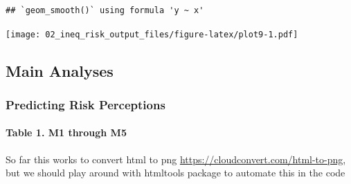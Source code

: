 \documentclass[
]{article}
\begin{document}
\begin{verbatim}
## `geom_smooth()` using formula 'y ~ x'
\end{verbatim}

\texttt{[image: 02\_ineq\_risk\_output\_files/figure-latex/plot9-1.pdf]}

\hypertarget{main-analyses}{%
\subsection{Main Analyses}\label{main-analyses}}

\hypertarget{predicting-risk-perceptions}{%
\subsubsection{Predicting Risk
Perceptions}\label{predicting-risk-perceptions}}

\hypertarget{table-1.-m1-through-m5}{%
\paragraph{Table 1. M1 through M5}\label{table-1.-m1-through-m5}}

So far this works to convert html to png
\url{https://cloudconvert.com/html-to-png}, but we should play around
with htmltools package to automate this in the code
\end{document}
